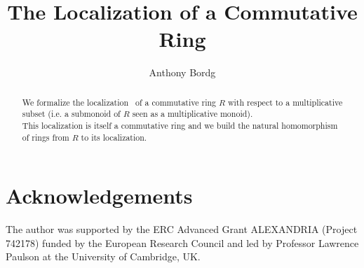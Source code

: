 \documentclass[11pt,a4paper]{article}
\begin{document}
\title{The Localization of a Commutative Ring}
\author{Anthony Bordg}
\maketitle

\begin{abstract}
We formalize the localization~\cite[II, \S4]{SL-Alg} of a commutative ring $R$ with respect to a multiplicative subset (i.e. a submonoid of $R$ seen as a multiplicative monoid). \\ This localization is itself a commutative ring and we build the natural homomorphism of rings from $R$ to its localization.

\end{abstract}

\tableofcontents




\section{Acknowledgements}
The author was supported by the ERC Advanced Grant ALEXANDRIA (Project 742178) funded by the European Research Council and led by Professor Lawrence Paulson at the University of Cambridge, UK.




\end{document}
